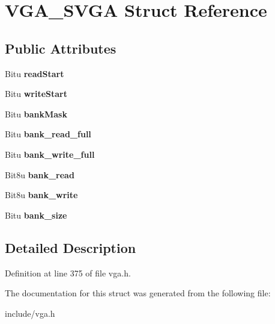 \hypertarget{structVGA__SVGA}{\section{V\-G\-A\-\_\-\-S\-V\-G\-A Struct Reference}
\label{structVGA__SVGA}
}
\subsection*{Public Attributes}
\begin{DoxyCompactItemize}
\item 
\hypertarget{structVGA__SVGA_a12feba28b67c048513e66e201fac71dc}{Bitu {\bfseries read\-Start}}\label{structVGA__SVGA_a12feba28b67c048513e66e201fac71dc}

\item 
\hypertarget{structVGA__SVGA_a6dd88ed646507e88dec8ea6f36168810}{Bitu {\bfseries write\-Start}}\label{structVGA__SVGA_a6dd88ed646507e88dec8ea6f36168810}

\item 
\hypertarget{structVGA__SVGA_ac754dc12435255d72973c78b3130f611}{Bitu {\bfseries bank\-Mask}}\label{structVGA__SVGA_ac754dc12435255d72973c78b3130f611}

\item 
\hypertarget{structVGA__SVGA_a709b930e64d2c6a7f97f2a707a8c6baa}{Bitu {\bfseries bank\-\_\-read\-\_\-full}}\label{structVGA__SVGA_a709b930e64d2c6a7f97f2a707a8c6baa}

\item 
\hypertarget{structVGA__SVGA_ab222686ed91393c5f22fcbc2683a9afb}{Bitu {\bfseries bank\-\_\-write\-\_\-full}}\label{structVGA__SVGA_ab222686ed91393c5f22fcbc2683a9afb}

\item 
\hypertarget{structVGA__SVGA_a97458414e7c3e11d66fe7a04442ee044}{Bit8u {\bfseries bank\-\_\-read}}\label{structVGA__SVGA_a97458414e7c3e11d66fe7a04442ee044}

\item 
\hypertarget{structVGA__SVGA_ad9e4750a5b4addc6f5b5bd332cec147f}{Bit8u {\bfseries bank\-\_\-write}}\label{structVGA__SVGA_ad9e4750a5b4addc6f5b5bd332cec147f}

\item 
\hypertarget{structVGA__SVGA_a3182c5e72fb68b0c125e9f350de5a2e3}{Bitu {\bfseries bank\-\_\-size}}\label{structVGA__SVGA_a3182c5e72fb68b0c125e9f350de5a2e3}

\end{DoxyCompactItemize}


\subsection{Detailed Description}


Definition at line 375 of file vga.\-h.



The documentation for this struct was generated from the following file\-:\begin{DoxyCompactItemize}
\item 
include/vga.\-h\end{DoxyCompactItemize}
